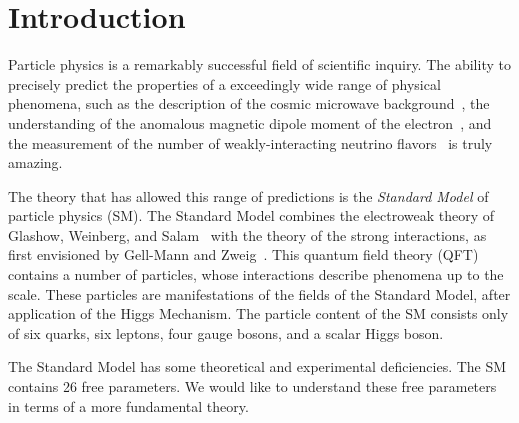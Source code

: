 
\chapter{Introduction}
\label{ch:intro}

Particle physics is a remarkably successful field of scientific inquiry.
The ability to precisely predict the properties of a exceedingly wide range of physical phenomena, such as the description of the cosmic microwave background~\cite{Perdereau:2016akt,Aghanim:2016sns}, the understanding of the anomalous magnetic dipole moment of the electron~\cite{Schwinger:1948iu, Laporta:1996mq}, and the measurement of the number of weakly-interacting neutrino flavors~\cite{ALEPH:2005ab} is truly amazing.

The theory that has allowed this range of predictions is the \textit{Standard Model} of particle physics (SM).
The Standard Model combines the electroweak theory of Glashow, Weinberg, and Salam~\cite{Glashow:1961tr, Weinberg:1967tq,  Salam:1968rm} with the theory of the strong interactions, as first envisioned by Gell-Mann and Zweig~\cite{GellMann:1964nj, Zweig:1964jf}.
This quantum field theory (QFT) contains a number of particles, whose interactions describe phenomena up to the \TeV\xspace scale.
These particles are manifestations of the fields of the Standard Model, after application of the Higgs Mechanism.
The particle content of the SM consists only of six quarks, six leptons, four gauge bosons, and a scalar Higgs boson.

The Standard Model has some theoretical and experimental deficiencies.
The SM contains 26 free parameters\footnotemark.
We would like to understand these free parameters in terms of a more fundamental theory.

